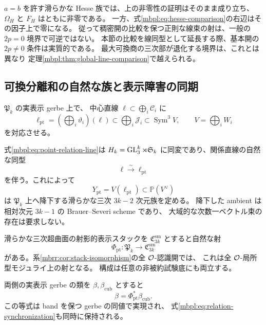 \begin{remark}[二捩れ境界と比較の零点]
\label{mbpl:rem:two-torsion-boundary}
$a=b$ を許す滑らかな Hesse 族では、上の非零性の証明はそのまま成り立ち、
$\Omega_H$ と $F_H$ はともに非零である。
一方、式\eqref{mbpl:eq:hesse-comparison}の右辺はその因子上で零になる。
従って稠密開の比較を保つ正則な線束の射は、一般の $2p=0$ 境界で可逆ではない。
本節の比較を線同型として延長する際、基本開の $2p\ne0$ 条件は実質的である。
最大可換商の三次部が退化する境界は、これとは異なり
定理\ref{mbpl:thm:global-line-comparison}で越えられる。
\end{remark}

\subsection{可換分離和の自然な族と表示障害の同期}

$\mathfrak P_k$ の実表示 gerbe 上で、
中心直線 $\ell\subset\bigoplus_i\mathcal C_i$ に
\begin{equation}\label{mbpl:eq:point-relation-line}
 \ell_{\mathrm{pt}}=
 \left(\bigoplus_i\vartheta_i\right)(\ell)
 \subset\bigoplus_i\mathcal J_i\subset\operatorname{Sym}^3V,
 \qquad V=\bigoplus_iW_i
\end{equation}
を対応させる。

\begin{theorem}[全構造対象開上の可換三次族]
\label{mbpl:thm:commutative-family}
式\eqref{mbpl:eq:point-relation-line}は
$H_k=\operatorname{GL}_3^k\rtimes\mathfrak S_k$ に同変であり、関係直線の自然な同型
\begin{equation}\label{mbpl:eq:relation-synchronization}
 \ell\xrightarrow{\sim}\ell_{\mathrm{pt}}
\end{equation}
を伴う。これによって
\[
 Y_{\mathrm{pt}}=V(\ell_{\mathrm{pt}})\subset\mathbb P(V^\vee)
\]
は $\mathfrak P_k$ 上へ降下する滑らかな三次 $3k-2$ 次元族を定める。
降下した ambient は相対次元 $3k-1$ の Brauer--Severi scheme であり、
大域的な次数一ベクトル束の存在は要求しない。

滑らかな三次超曲面の射影的表示スタックを
$\mathfrak C_{3k}^{\mathrm{sm}}$ とすると自然な射
\begin{equation}\label{mbpl:eq:moduli-map}
 \Phi_{\mathrm{pt}}:\mathfrak P_k
       \longrightarrow\mathfrak C_{3k}^{\mathrm{sm}}
\end{equation}
がある。系\ref{mbrr:cor:stack-isomorphism}の全 $\mathcal O$-認識開では、
これは全 $\mathcal O$-局所型モジュライ上の射となる。
構成は任意の非被約試験底にも両立する。

両側の実表示 gerbe の類を $\beta,\beta_{\mathrm{cub}}$ とすると
\begin{equation}\label{mbpl:eq:brauer-synchronization}
 \beta=\Phi_{\mathrm{pt}}^*\beta_{\mathrm{cub}}.
\end{equation}
この等式は band を保つ gerbe の同値で実現され、
式\eqref{mbpl:eq:relation-synchronization}も同時に保持される。
\end{theorem}

